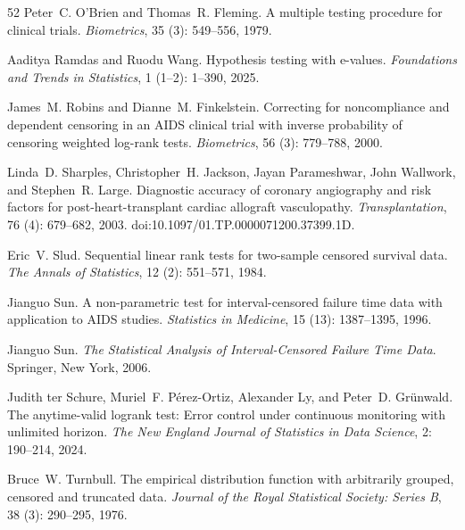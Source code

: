 \documentclass[12pt]{article}
\theoremstyle{definition}
\theoremstyle{remark}
\begin{document}
\begin{thebibliography}{52}
Peter~C. O'Brien and Thomas~R. Fleming.
\newblock A multiple testing procedure for clinical trials.
\newblock \emph{Biometrics}, 35 (3): 549--556, 1979.

Aaditya Ramdas and Ruodu Wang.
\newblock Hypothesis testing with e-values.
\newblock \emph{Foundations and Trends in Statistics}, 1
  (1--2): 1--390, 2025.

James~M. Robins and Dianne~M. Finkelstein.
\newblock Correcting for noncompliance and dependent censoring in an {AIDS}
  clinical trial with inverse probability of censoring weighted log-rank tests.
\newblock \emph{Biometrics}, 56 (3): 779--788, 2000.

Linda~D. Sharples, Christopher~H. Jackson, Jayan Parameshwar, John Wallwork,
  and Stephen~R. Large.
\newblock Diagnostic accuracy of coronary angiography and risk factors for
  post-heart-transplant cardiac allograft vasculopathy.
\newblock \emph{Transplantation}, 76 (4): 679--682, 2003.
\newblock doi:10.1097/01.TP.0000071200.37399.1D.

Eric~V. Slud.
\newblock Sequential linear rank tests for two-sample censored survival data.
\newblock \emph{The Annals of Statistics}, 12 (2): 551--571,
  1984.

Jianguo Sun.
\newblock A non-parametric test for interval-censored failure time data with
  application to {AIDS} studies.
\newblock \emph{Statistics in Medicine}, 15 (13): 1387--1395,
  1996.

Jianguo Sun.
\newblock \emph{The Statistical Analysis of Interval-Censored Failure Time
  Data}.
\newblock Springer, New York, 2006.

Judith ter Schure, Muriel~F. P\'erez-Ortiz, Alexander Ly, and Peter~D.
  Gr\"unwald.
\newblock The anytime-valid logrank test: Error control under continuous
  monitoring with unlimited horizon.
\newblock \emph{The New England Journal of Statistics in Data Science},
  2: 190--214, 2024.

Bruce~W. Turnbull.
\newblock The empirical distribution function with arbitrarily grouped,
  censored and truncated data.
\newblock \emph{Journal of the Royal Statistical Society: Series B},
  38 (3): 290--295, 1976.


\end{thebibliography}
\end{document}
